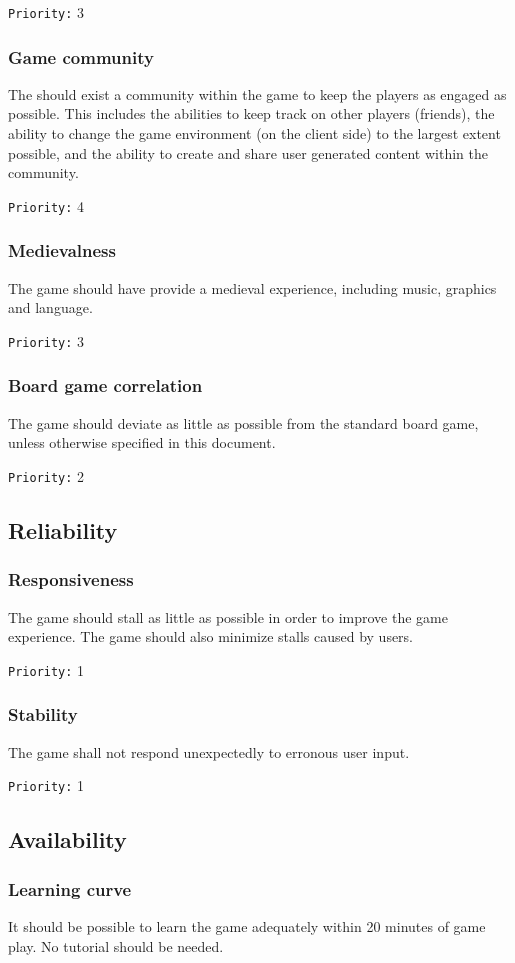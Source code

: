 \documentclass[a4paper,10pt]{article}
\newcommand{\prio}[1]{\texttt{Priority:} #1}
\begin{document}
\prio{3}

\subsubsection{Game community}
The should exist a community within the game to keep the players as engaged as possible. This includes the abilities to keep track on other players (friends), the ability to change the game environment (on the client side) to the largest extent possible, and the ability to create and share user generated content within the community.

\prio{4}

\subsubsection{Medievalness}
The game should have provide a medieval experience, including music, graphics and language.

\prio{3}

\subsubsection{Board game correlation}
The game should deviate as little as possible from the standard board game, unless otherwise specified in this document.

\prio{2}

\subsection{Reliability}
\subsubsection{Responsiveness}
The game should stall as little as possible in order to improve the game experience. The game should also minimize stalls caused by users.

\prio{1}

\subsubsection{Stability}
The game shall not respond unexpectedly to erronous user input.

\prio{1}

\subsection{Availability}
\subsubsection{Learning curve}
It should be possible to learn the game adequately within 20 minutes of game play. No tutorial should be needed.
\end{document}
